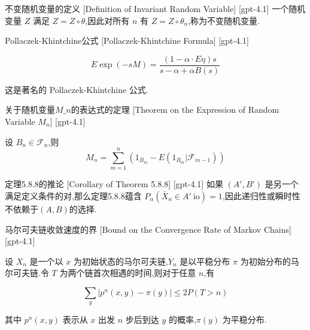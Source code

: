 \documentclass[UTF8]{ctexart}
\begin{document}
    
    
    \begin{dfn}
        {不变随机变量的定义}
        [Definition of Invariant Random Variable]
        [gpt-4.1]
        一个随机变量 $Z$ 满足 $Z = Z \circ \theta$,因此对所有 $n$ 有 $Z = Z \circ \theta_{n}$,称为不变随机变量.
    \end{dfn}
    
    
    
    \begin{thm}
        {Pollaczek-Khintchine公式}
        [Pollaczek-Khintchine Formula]
        [gpt-4.1]
        
\[
E \exp ( - s M ) = \frac { ( 1 - \alpha \cdot E \eta ) s } { s - \alpha + \alpha B ( s ) }
\]

这是著名的 Pollaczek-Khintchine 公式.

    \end{thm}
    
    
    
    \begin{thm}
        {关于随机变量$M\_n$的表达式的定理}
        [Theorem on the Expression of Random Variable $M_n$]
        [gpt-4.1]
        
设 $B_{n} \in \mathcal{F}_{n}$,则
\[
M_{n} = \sum_{m=1}^{n} \left( 1_{B_{m}} - E(1_{B_{m}} | \mathcal{F}_{m-1}) \right)
\]

    \end{thm}
    
    
    
    \begin{thm}
        {定理5.8.8的推论}
        [Corollary of Theorem 5.8.8]
        [gpt-4.1]
        如果 $(A', B')$ 是另一个满足定义条件的对,那么定理5.8.8蕴含 $P_{\alpha}(\bar{X}_n \in A' \ \mathrm{io}) = 1$,因此递归性或瞬时性不依赖于$(A, B)$的选择.
    \end{thm}
    
    
    
    \begin{thm}
        {马尔可夫链收敛速度的界}
        [Bound on the Convergence Rate of Markov Chains]
        [gpt-4.1]
        
设 $X_n$ 是一个以 $x$ 为初始状态的马尔可夫链,$Y_n$ 是以平稳分布 $\pi$ 为初始分布的马尔可夫链.令 $T$ 为两个链首次相遇的时间,则对于任意 $n$,有

\[
\sum_{y} |p^n(x, y) - \pi(y)| \leq 2 P(T > n)
\]

其中 $p^n(x, y)$ 表示从 $x$ 出发 $n$ 步后到达 $y$ 的概率,$\pi(y)$ 为平稳分布.

    \end{thm}
    
\end{document}
